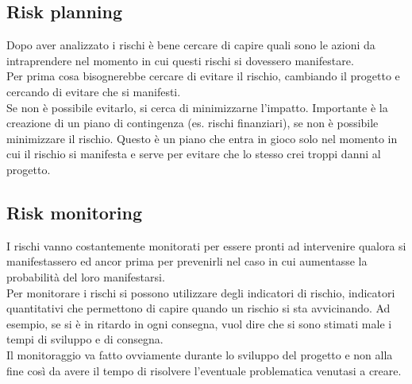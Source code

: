 \subsection{Risk planning}
Dopo aver analizzato i rischi è bene cercare di capire quali sono le azioni da intraprendere nel momento in cui questi rischi si dovessero manifestare.\\
Per prima cosa bisognerebbe cercare di evitare il rischio, cambiando il progetto e cercando di evitare che si manifesti.\\
Se non è possibile evitarlo, si cerca di minimizzarne l'impatto.
Importante è la creazione di un piano di contingenza (es. rischi finanziari), se non è possibile minimizzare il rischio.
Questo è un piano che entra in gioco solo nel momento in cui il rischio si manifesta e serve per evitare che lo stesso crei troppi danni al progetto.

\subsection{Risk monitoring}
I rischi vanno costantemente monitorati per essere pronti ad intervenire qualora si manifestassero ed ancor prima per prevenirli nel caso in cui aumentasse la probabilità del loro manifestarsi.\\
Per monitorare i rischi si possono utilizzare degli indicatori di rischio, indicatori quantitativi che permettono di capire quando un rischio si sta avvicinando.
Ad esempio, se si è in ritardo in ogni consegna, vuol dire che si sono stimati male i tempi di sviluppo e di consegna.\\
Il monitoraggio va fatto ovviamente durante lo sviluppo del progetto e non alla fine così da avere il tempo di risolvere l'eventuale problematica venutasi a creare.

